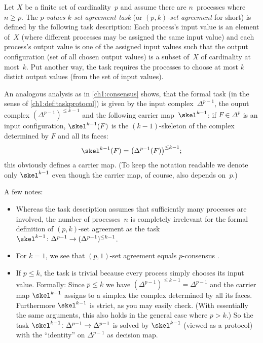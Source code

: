 \begin{thExample}
    \label{ch1:setagreement}
    Let $X$ be a finite set of cardinality~$p$ and assume there are
    $n$~processes where $n\geq p$.  The \emph{$p$-values $k$-set
    agreement task} (or \emph{$(p,k)$-set agreement} for short) is
    defined by the following task description:
    Each process's input value is an element of~$X$ (where different
    processes may be assigned the same input value) and each process's
    output value is one of the assigned input values such that
    the output configuration (set of all chosen output values)
    is a subset of~$X$ of cardinality at most~$k$. Put another way,
    the task requires the processes to choose at most $k$ distict
    output values (from the set of input values).
    
    An analogous analysis as in \cref{ch1:consensus} shows, that
    the formal task (in the sense of \cref{ch1:def:taskprotocol})
    is given by the input complex~$\Delta^{p-1}$, the ouput complex
    $(\Delta^{p-1})^{\leq k-1}$ and the following carrier map~$\skel^{k-1}$:
    if $F\in\Delta^p$ is an input configuration, $\skel^{k-1}(F)$ is the
    $(k{-}1)$-skeleton of the complex determined by $F$ and all its faces:
    \[ \skel^{k-1}(F) = \bigl(\Delta^{p-1}(F)\bigr)^{\leq k-1}
    ; \]
    this obviously defines a carrier map. (To keep the notation
    readable we denote only $\skel^{k-1}$ even though the carrier map,
    of course, also depends on~$p$.)
    
    A few notes:
    \begin{itemize}
        \item
            Whereas the task description assumes that sufficiently many
            processes are involved, the number of processes~$n$ is completely
            irrelevant for the formal definition of $(p,k)$-set agreement
            as the task
            $\skel^{k-1}\colon\Delta^{p-1}\to(\Delta^{p-1})^{\leq k-1}$.
            
        \item
            For $k=1$, we see that $(p,1)$-set agreement equals $p$-consensus
            .
            
        \item
            If $p\leq k$, the task is trivial because every process simply
            chooses its input value. Formally: Since $p\leq k$ we have
            $(\Delta^{p-1})^{\leq k-1} = \Delta^{p-1}$ and the carrier map
            $\skel^{k-1}$ assigns to a simplex the complex determined by all its
            faces. Furthermore $\skel^{k-1}$ is strict, as you may easily check.
            (With essentially the same arguments, this also holds in the general
            case where $p > k$.) So the task
            $\skel^{k-1}\colon\Delta^{p-1}\to\Delta^{p-1}$
            is solved by $\skel^{k-1}$ (viewed as a protocol) with the
            \enquote{identity} on $\Delta^{p-1}$ as decision map.
    \end{itemize}
\end{thExample}

